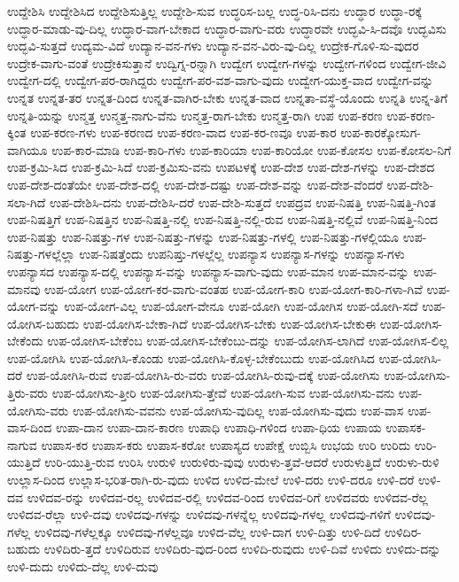 {ಉದ್ದೇಶಿಸಿ
ಉದ್ದೇಶಿಸಿದ
ಉದ್ದೇಶಿಸುತ್ತಿಲ್ಲ
ಉದ್ದೇಶಿ-ಸುವ
ಉದ್ಧರಿಸ-ಬಲ್ಲ
ಉದ್ಧ-ರಿಸಿ-ದನು
ಉದ್ಧಾರ
ಉದ್ಧಾ-ರಕ್ಕೆ
ಉದ್ಧಾರ-ಮಾಡು-ವು-ದಿಲ್ಲ
ಉದ್ಧಾರ-ವಾಗ-ಬೇಕಾದ
ಉದ್ಧಾರ-ವಾಗು-ವರು
ಉದ್ಧಾರವೇ
ಉದ್ಭವಿ-ಸಿ-ದವೊ
ಉದ್ಭವಿಸು
ಉದ್ಭವಿ-ಸುತ್ತದೆ
ಉದ್ಯಮ-ವಿದೆ
ಉದ್ಯಾನ-ವನ-ಗಳು
ಉದ್ಯಾನ-ವನ-ವಿರು-ವು-ದಿಲ್ಲ
ಉದ್ರೇಕ-ಗೊಳಿ-ಸು-ವುದರ
ಉದ್ರೇಕ-ವಾಗು-ವಂತೆ
ಉದ್ರೇಕಿಸುತ್ತಾನೆ
ಉದ್ವಿಗ್ನ-ರನ್ನಾಗಿ
ಉದ್ವೇಗ
ಉದ್ವೇಗ-ಗಳನ್ನು
ಉದ್ವೇಗ-ಗಳಿಂದ
ಉದ್ವೇಗ-ಜೀವಿ
ಉದ್ವೇಗ-ದಲ್ಲಿ
ಉದ್ವೇಗ-ಪರ-ರಾಗಿದ್ದರು
ಉದ್ವೇಗ-ಪರ-ವಶ-ವಾಗು-ವುದು
ಉದ್ವೇಗ-ಯುಕ್ತ-ವಾದ
ಉದ್ವೇಗ-ವನ್ನು
ಉನ್ನತ
ಉನ್ನತ-ತರ
ಉನ್ನತ-ದಿಂದ
ಉನ್ನತ-ವಾಗಿರ-ಬೇಕು
ಉನ್ನತ-ವಾದ
ಉನ್ನತಾ-ವಸ್ಥೆ-ಯೊಂದು
ಉನ್ನತಿ
ಉನ್ನ-ತಿಗೆ
ಉನ್ನತಿ-ಯನ್ನು
ಉನ್ಮತ್ತ
ಉನ್ಮತ್ತ-ನಾಗು-ವೆನು
ಉನ್ಮತ್ತ-ರಾಗ-ಬೇಕು
ಉನ್ಮತ್ತ-ರಾಗಿ
ಉಪ
ಉಪ-ಕರಣ
ಉಪ-ಕರಣ-ಕ್ಕಿಂತ
ಉಪ-ಕರಣ-ಗಳು
ಉಪ-ಕರಣದ
ಉಪ-ಕರಣ-ವಾದ
ಉಪ-ಕರ-ಣವೂ
ಉಪ-ಕಾರ
ಉಪ-ಕಾರಕ್ಕೋಸುಗ-ವಾಗಿಯೂ
ಉಪ-ಕಾರ-ಮಾಡಿ
ಉಪ-ಕಾರಿ-ಗಳು
ಉಪ-ಕಾರಿಯಾ
ಉಪ-ಕಾರಿಯೋ
ಉಪ-ಕೋಸಲ
ಉಪ-ಕೋಸಲ-ನಿಗೆ
ಉಪ-ಕ್ರಮಿ-ಸಿದ
ಉಪ-ಕ್ರಮಿ-ಸಿದೆ
ಉಪ-ಕ್ರಮಿಸು-ವನು
ಉಪಟಳಕ್ಕೆ
ಉಪ-ದೇಶ
ಉಪ-ದೇಶ-ಗಳನ್ನು
ಉಪ-ದೇಶದ
ಉಪ-ದೇಶ-ದಂತೆಯೇ
ಉಪ-ದೇಶ-ದಲ್ಲಿ
ಉಪ-ದೇಶ-ದಷ್ಟು
ಉಪ-ದೇಶ-ವನ್ನು
ಉಪ-ದೇಶ-ವೆಂದರೆ
ಉಪ-ದೇಶಿ-ಸಲಾ-ಗಿದೆ
ಉಪ-ದೇಶಿಸಿ-ದನು
ಉಪ-ದೇಶಿಸಿ-ದರೆ
ಉಪ-ದೇಶಿ-ಸುತ್ತದೆ
ಉಪದ್ರವ
ಉಪ-ನಿಷತ್ತಿ
ಉಪ-ನಿಷತ್ತಿ-ಗಿಂತ
ಉಪ-ನಿಷತ್ತಿಗೆ
ಉಪ-ನಿಷತ್ತಿನ
ಉಪ-ನಿಷತ್ತಿ-ನಲ್ಲಿ
ಉಪ-ನಿಷತ್ತಿ-ನಲ್ಲಿ-ರುವ
ಉಪ-ನಿಷತ್ತಿ-ನಲ್ಲಿವೆ
ಉಪ-ನಿಷತ್ತಿ-ನಿಂದ
ಉಪ-ನಿಷತ್ತು
ಉಪ-ನಿಷತ್ತು-ಗಳ
ಉಪ-ನಿಷತ್ತು-ಗಳನ್ನು
ಉಪ-ನಿಷತ್ತು-ಗಳಲ್ಲಿ
ಉಪ-ನಿಷತ್ತು-ಗಳಲ್ಲಿಯೂ
ಉಪ-ನಿಷತ್ತು-ಗಳಲ್ಲೆಲ್ಲಾ
ಉಪ-ನಿಷತ್ತೆಂದು
ಉಪನಿಷ್ತು-ಗಳಲ್ಲೆಲ್ಲ
ಉಪನ್ಯಾಸ
ಉಪನ್ಯಾಸ-ಗಳನ್ನು
ಉಪನ್ಯಾಸ-ಗಳು
ಉಪನ್ಯಾಸದ
ಉಪನ್ಯಾಸ-ದಲ್ಲಿ
ಉಪನ್ಯಾಸ-ವನ್ನು
ಉಪನ್ಯಾಸ-ವಾಗು-ವುದು
ಉಪ-ಮಾನ
ಉಪ-ಮಾನ-ವನ್ನು
ಉಪ-ಮಾನವು
ಉಪ-ಯೋಗ
ಉಪ-ಯೋಗ-ಕರ-ವಾಗು-ವಂತಹ
ಉಪ-ಯೋಗ-ಕಾರಿ
ಉಪ-ಯೋಗ-ಕಾರಿ-ಗಳಾ-ಗಿವೆ
ಉಪ-ಯೋಗ-ವನ್ನು
ಉಪ-ಯೋಗ-ವಿಲ್ಲ
ಉಪ-ಯೋಗ-ವೇನೂ
ಉಪ-ಯೋಗಿ
ಉಪ-ಯೋಗಿಸ
ಉಪ-ಯೋಗಿ-ಸದೆ
ಉಪ-ಯೋಗಿಸ-ಬಹುದು
ಉಪ-ಯೋಗಿಸ-ಬೇಕಾ-ಗಿದೆ
ಉಪ-ಯೋಗಿಸ-ಬೇಕು
ಉಪ-ಯೋಗಿಸ-ಬೇಕುಈ
ಉಪ-ಯೋಗಿಸ-ಬೇಕೆಂದು
ಉಪ-ಯೋಗಿಸ-ಬೇಕೆಂಬ
ಉಪ-ಯೋಗಿಸ-ಬೇಕೆಂಬು-ದನ್ನು
ಉಪ-ಯೋಗಿಸ-ಲಾಗಿದೆ
ಉಪ-ಯೋಗಿಸ-ಲಿಲ್ಲ
ಉಪ-ಯೋಗಿಸಿ
ಉಪ-ಯೋಗಿಸಿ-ಕೊಂಡು
ಉಪ-ಯೋಗಿಸಿ-ಕೊಳ್ಳ-ಬೇಕೆಂಬುದು
ಉಪ-ಯೋಗಿಸಿದ
ಉಪ-ಯೋಗಿಸಿ-ದರೆ
ಉಪ-ಯೋಗಿಸಿ-ರುವ
ಉಪ-ಯೋಗಿಸಿ-ರು-ವರು
ಉಪ-ಯೋಗಿಸಿ-ರುವು-ದಕ್ಕೆ
ಉಪ-ಯೋಗಿಸು
ಉಪ-ಯೋಗಿಸು-ತ್ತಿರು-ವರು
ಉಪ-ಯೋಗಿಸು-ತ್ತೀರಿ
ಉಪ-ಯೋಗಿಸು-ತ್ತೇವೆ
ಉಪ-ಯೋಗಿ-ಸುವ
ಉಪ-ಯೋಗಿಸು-ವನು
ಉಪ-ಯೋಗಿಸು-ವರು
ಉಪ-ಯೋಗಿಸು-ವವನು
ಉಪ-ಯೋಗಿಸು-ವುದಿಲ್ಲ
ಉಪ-ಯೋಗಿಸು-ವುದು
ಉಪ-ವಾಸ
ಉಪ-ವಾಸ-ದಿಂದ
ಉಪಾ-ದಾನ
ಉಪಾ-ದಾನ-ಕಾರಣ
ಉಪಾಧಿ
ಉಪಾಧಿ-ಗಳಿಂದ
ಉಪಾ-ಧಿಯ
ಉಪಾಯ
ಉಪಾಸಕ-ನಾಗುವ
ಉಪಾಸ-ಕರ
ಉಪಾಸ-ಕರು
ಉಪಾಸ-ಕರೋ
ಉಪಾಸ್ಯದ
ಉಪೇಕ್ಷೆ
ಉಬ್ಬಿಸಿ
ಉಭಯ
ಉರಿ
ಉರಿದು
ಉರಿ-ಯುತ್ತಿದೆ
ಉರಿ-ಯುತ್ತಿ-ರುವ
ಉರಿಸಿ
ಉರುಳಿ
ಉರುಳಿರು-ವುವು
ಉರುಳು-ತ್ತವೆ-ಆದರೆ
ಉರುಳುತ್ತಿದೆ
ಉರುಳು-ರುಳಿ
ಉಲ್ಲಾಸ-ದಿಂದ
ಉಲ್ಲಾಸ-ಭರಿತ-ರಾಗಿ-ರು-ವುದು
ಉಳಿದ
ಉಳಿದ-ಮೇಲೆ
ಉಳಿ-ದರು
ಉಳಿ-ದರೂ
ಉಳಿ-ದರೆ
ಉಳಿ-ದವ
ಉಳಿದವ-ರನ್ನು
ಉಳಿದವ-ರಲ್ಲ
ಉಳಿದವ-ರಲ್ಲಿ
ಉಳಿದವ-ರಿಂದ
ಉಳಿದವ-ರಿಗೆ
ಉಳಿದವರು
ಉಳಿದವ-ರೆಲ್ಲ
ಉಳಿದವ-ರೆಲ್ಲಾ
ಉಳಿ-ದವು
ಉಳಿದವು-ಗಳನ್ನು
ಉಳಿದವು-ಗಳನ್ನೆಲ್ಲ
ಉಳಿದವು-ಗಳಲ್ಲ
ಉಳಿದವು-ಗಳಿಗೆ
ಉಳಿದವು-ಗಳೆಲ್ಲ
ಉಳಿದವು-ಗಳೆಲ್ಲಕ್ಕೂ
ಉಳಿದವು-ಗಳೆಲ್ಲವೂ
ಉಳಿದ-ವೆಲ್ಲ
ಉಳಿ-ದಾಗ
ಉಳಿ-ದಿತ್ತು
ಉಳಿ-ದಿದೆ
ಉಳಿದಿರ-ಬಹುದು
ಉಳಿದಿರು-ತ್ತದೆ
ಉಳಿದಿರುವ
ಉಳಿದಿರು-ವುದ-ರಿಂದ
ಉಳಿದಿ-ರುವುದು
ಉಳಿ-ದಿವೆ
ಉಳಿದು
ಉಳಿದು-ದನ್ನು
ಉಳಿ-ದುದು
ಉಳಿದು-ದೆಲ್ಲ
ಉಳಿ-ದುವು
}
